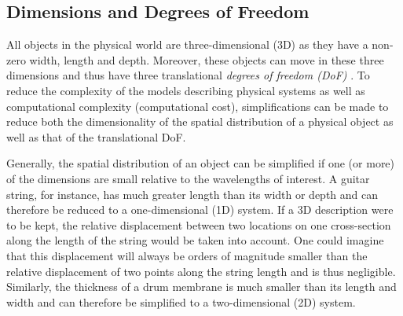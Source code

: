 

\subsection{Dimensions and Degrees of Freedom}\label{sec:dimensions}
All objects in the physical world are three-dimensional (3D) as they have a non-zero width, length and depth. Moreover, these objects can move in these three dimensions and thus have three translational \textit{degrees of freedom (DoF)} . 
To reduce the complexity of the models describing physical systems as well as computational complexity (computational cost), simplifications can be made to reduce both the dimensionality of the spatial distribution of a physical object as well as that of the translational DoF. 

Generally, the spatial distribution of an object can be simplified if one (or more) of the dimensions are small relative to the wavelengths of interest. A guitar string, for instance, has much greater length than its width or depth and can therefore be reduced to a one-dimensional (1D) system. If a 3D description were to be kept, the relative displacement between two locations on one cross-section along the length of the string would be taken into account. One could imagine that this displacement will always be orders of magnitude smaller than the relative displacement of two points along the string length and is thus negligible. Similarly, the thickness of a drum membrane is much smaller than its length and width and can therefore be simplified to a two-dimensional (2D) system. 

